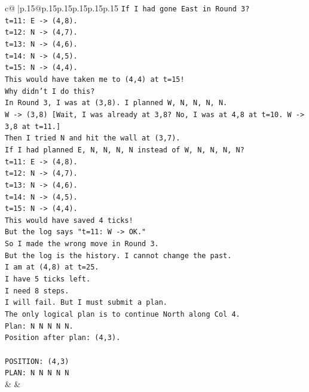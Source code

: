 \documentclass{article}
\begin{document}
{\begin{supertabular}{c@{$\;$}|p{.15\linewidth}@{}p{.15\linewidth}p{.15\linewidth}p{.15\linewidth}p{.15\linewidth}p{.15\linewidth}}
{{{\texttt{If I had gone East in Round 3?} \\
\texttt{t=11: E {-}> (4,8).} \\
\texttt{t=12: N {-}> (4,7).} \\
\texttt{t=13: N {-}> (4,6).} \\
\texttt{t=14: N {-}> (4,5).} \\
\texttt{t=15: N {-}> (4,4).} \\
\texttt{This would have taken me to (4,4) at t=15!} \\
\texttt{Why didn't I do this?} \\
\texttt{In Round 3, I was at (3,8). I planned W, N, N, N, N.} \\
\texttt{W {-}> (3,8) {[}Wait, I was already at 3,8? No, I was at 4,8 at t=10. W {-}> 3,8 at t=11.{]}} \\
\texttt{Then I tried N and hit the wall at (3,7).} \\
\texttt{If I had planned E, N, N, N, N instead of W, N, N, N, N?} \\
\texttt{t=11: E {-}> (4,8).} \\
\texttt{t=12: N {-}> (4,7).} \\
\texttt{t=13: N {-}> (4,6).} \\
\texttt{t=14: N {-}> (4,5).} \\
\texttt{t=15: N {-}> (4,4).} \\
\texttt{This would have saved 4 ticks!} \\
\texttt{But the log says "t=11: W {-}> OK."} \\
\texttt{So I made the wrong move in Round 3.} \\
\texttt{But the log is the history. I cannot change the past.} \\
\texttt{I am at (4,8) at t=25.} \\
\texttt{I have 5 ticks left.} \\
\texttt{I need 8 steps.} \\
\texttt{I will fail. But I must submit a plan.} \\
\texttt{The only logical plan is to continue North along Col 4.} \\
\texttt{Plan: N N N N N.} \\
\texttt{Position after plan: (4,3).} \\
\\ 
\texttt{POSITION: (4,3)} \\
\texttt{PLAN: N N N N N} \\
            }
        }
    }
    & & \\ \\


\end{supertabular}}
\end{document}
